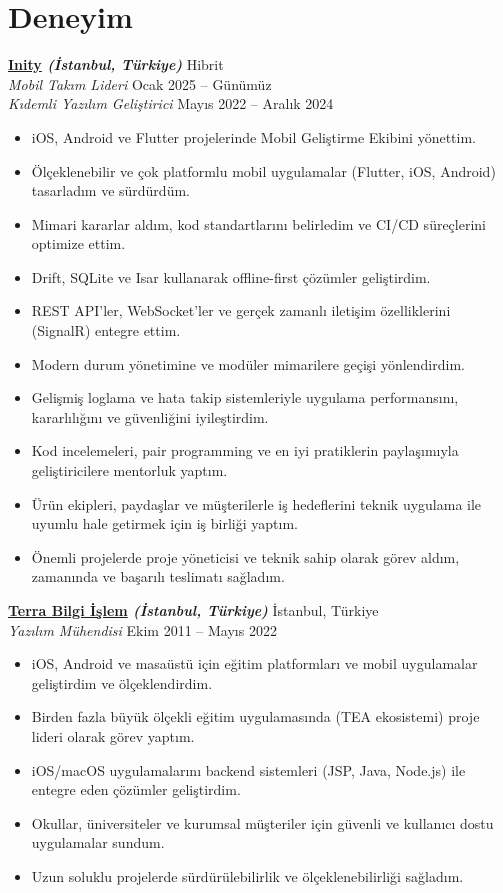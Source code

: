 \documentclass[10pt,a4paper]{extarticle}
\begin{document}
\section{Deneyim}
\vspace{5pt}
\textbf{\href{https://inity.com.tr}{Inity} \textit{(İstanbul, Türkiye)}} \hfill Hibrit\\
\textit{Mobil Takım Lideri} \hfill Ocak 2025 -- Günümüz\\
\textit{Kıdemli Yazılım Geliştirici} \hfill Mayıs 2022 -- Aralık 2024
\vspace{5pt}
\begin{itemize}[leftmargin=*,noitemsep,topsep=0pt]
    \item iOS, Android ve Flutter projelerinde Mobil Geliştirme Ekibini yönettim.
	\item Ölçeklenebilir ve çok platformlu mobil uygulamalar (Flutter, iOS, Android) tasarladım ve sürdürdüm.
	\item Mimari kararlar aldım, kod standartlarını belirledim ve CI/CD süreçlerini optimize ettim.
	\item Drift, SQLite ve Isar kullanarak offline-first çözümler geliştirdim.
	\item REST API’ler, WebSocket’ler ve gerçek zamanlı iletişim özelliklerini (SignalR) entegre ettim.
	\item Modern durum yönetimine ve modüler mimarilere geçişi yönlendirdim.
	\item Gelişmiş loglama ve hata takip sistemleriyle uygulama performansını, kararlılığını ve güvenliğini iyileştirdim.
	\item Kod incelemeleri, pair programming ve en iyi pratiklerin paylaşımıyla geliştiricilere mentorluk yaptım.
	\item Ürün ekipleri, paydaşlar ve müşterilerle iş hedeflerini teknik uygulama ile uyumlu hale getirmek için iş birliği yaptım.
    \item Önemli projelerde proje yöneticisi ve teknik sahip olarak görev aldım, zamanında ve başarılı teslimatı sağladım.
\end{itemize}
\vspace{15pt}
\textbf{\href{https://www.terrabilgiisilem.com}{Terra Bilgi İşlem} \textit{(İstanbul, Türkiye)}} \hfill İstanbul, Türkiye\\
\textit{Yazılım Mühendisi} \hfill Ekim 2011 -- Mayıs 2022
\vspace{5pt}
\begin{itemize}[leftmargin=*,noitemsep,topsep=0pt]
    \item iOS, Android ve masaüstü için eğitim platformları ve mobil uygulamalar geliştirdim ve ölçeklendirdim.
	\item Birden fazla büyük ölçekli eğitim uygulamasında (TEA ekosistemi) proje lideri olarak görev yaptım.
	\item iOS/macOS uygulamalarını backend sistemleri (JSP, Java, Node.js) ile entegre eden çözümler geliştirdim.
	\item Okullar, üniversiteler ve kurumsal müşteriler için güvenli ve kullanıcı dostu uygulamalar sundum.
	\item Uzun soluklu projelerde sürdürülebilirlik ve ölçeklenebilirliği sağladım.
\end{itemize}
\end{document}

